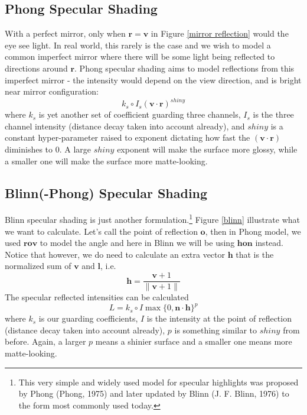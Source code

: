 \documentclass[11pt]{article}
\newcommand{\bh}{\mathbf{h}}
\newcommand{\bl}{\mathbf{l}}
\newcommand{\bn}{\mathbf{n}}
\newcommand{\bo}{\mathbf{o}}
\newcommand{\br}{\mathbf{r}}
\newcommand{\bv}{\mathbf{v}}
\begin{document}
\subsection{Phong Specular Shading}
With a perfect mirror, only when $\br = \bv$ in Figure \ref{mirror reflection} would the eye see light. In real world, this rarely is the case and we wish to model a common imperfect mirror where there will be some light being reflected to directions around $\br$. Phong specular shading aims to model reflections from this imperfect mirror - the intensity would depend on the view direction, and is bright near mirror configuration: 
\begin{equation}
	k_s \circ I_s (\bv \cdot \br)^{shiny}
\end{equation}
where $k_s$ is yet another set of coefficient guarding three channels, $I_s$ is the three channel intensity (distance decay taken into account already), and $shiny$ is a constant hyper-parameter raised to exponent dictating how fast the $(\bv \cdot \br)$ diminishes to $0$. A large $shiny$ exponent will make the surface more glossy, while a smaller one will make the surface more matte-looking. 

\subsection{Blinn(-Phong) Specular Shading}
Blinn specular shading is just another formulation.\footnote{This very simple and widely used model for specular highlights was proposed by Phong (Phong, 1975) and later updated by Blinn (J. F. Blinn, 1976) to the form most commonly used today.} Figure \ref{blinn} illustrate what we want to calculate. Let's call the point of reflection $\bo$, then in Phong model, we used $\br\bo\bv$ to model the angle and here in Blinn we will be using $\bh\bo\bn$ instead. Notice that however, we do need to calculate an extra vector $\bh$ that is the normalized sum of $\bv$ and $\bl$, i.e. 
\begin{equation}
	\mathbf{h}=\frac{\mathbf{v}+1}{\|\mathbf{v}+1\|}
\end{equation}
The specular reflected intensities can be calculated
\begin{equation}
	L = k_s \circ I \max \{ 0, \bn \cdot \bh \}^p
\end{equation}
where $k_s$ is our guarding coefficients, $I$ is the intensity at the point of reflection (distance decay taken into account already), $p$ is something similar to $shiny$ from before. Again, a larger $p$ means a shinier surface and  a smaller one means more matte-looking. 
\end{document}
